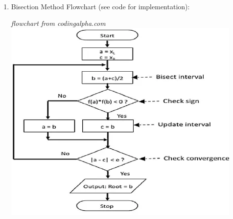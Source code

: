 \documentclass[12pt]{extarticle}
\begin{document}
\begin{enumerate}
\item Bisection Method Flowchart (see code for implementation):
\begin{center}
\textit{flowchart from codingalpha.com}
\includegraphics[width = .6\textwidth]{bisect_flow}
\end{center}
\end{enumerate}

\newpage
\end{document}
